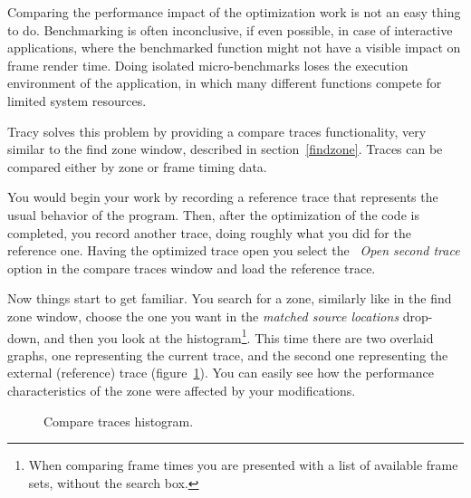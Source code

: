 \documentclass[hidelinks,titlepage,a4paper]{article}
\begin{document}
Comparing the performance impact of the optimization work is not an easy thing to do. Benchmarking is often inconclusive, if even possible, in case of interactive applications, where the benchmarked function might not have a visible impact on frame render time. Doing isolated micro-benchmarks loses the execution environment of the application, in which many different functions compete for limited system resources.

Tracy solves this problem by providing a compare traces functionality, very similar to the find zone window, described in section~\ref{findzone}. Traces can be compared either by zone or frame timing data.

You would begin your work by recording a reference trace that represents the usual behavior of the program. Then, after the optimization of the code is completed, you record another trace, doing roughly what you did for the reference one. Having the optimized trace open you select the \emph{\faFolderOpen{}~Open second trace} option in the compare traces window and load the reference trace.

Now things start to get familiar. You search for a zone, similarly like in the find zone window, choose the one you want in the \emph{matched source locations} drop-down, and then you look at the histogram\footnote{When comparing frame times you are presented with a list of available frame sets, without the search box.}. This time there are two overlaid graphs, one representing the current trace, and the second one representing the external (reference) trace (figure~\ref{comparehistogram}). You can easily see how the performance characteristics of the zone were affected by your modifications.

\begin{figure}[h]
\centering{}
\caption{Compare traces histogram.}
\label{comparehistogram}
\end{figure}
\end{document}
